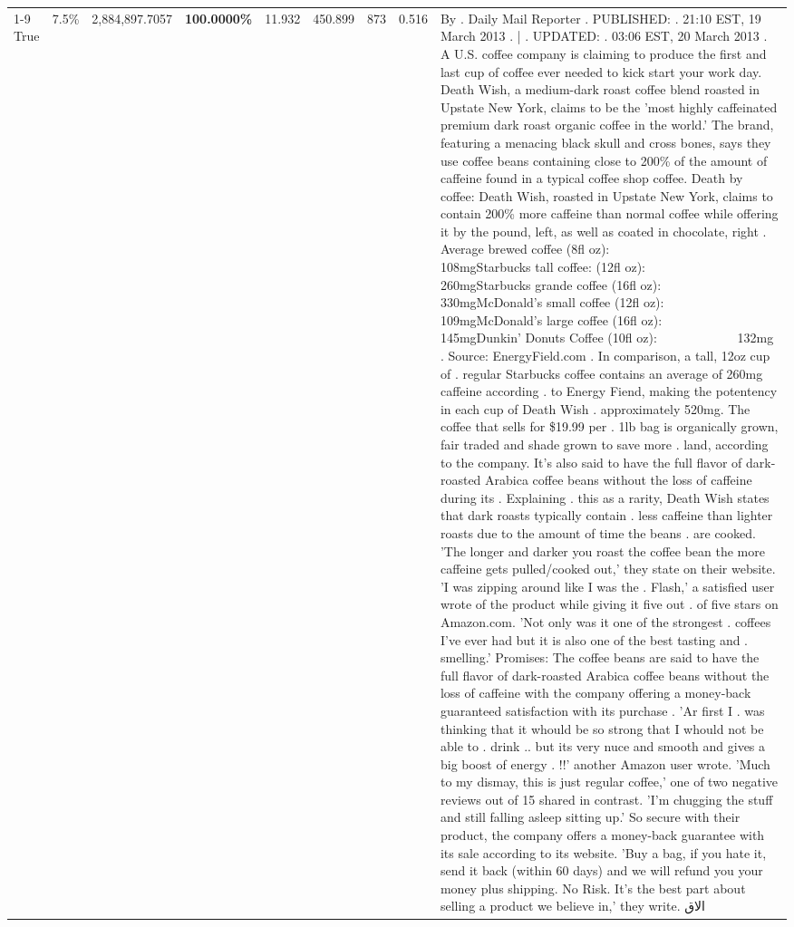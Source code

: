 \begin{table}[H]
{\begin{tabular}{lllrlllll}
\cline{1-9}
True & 7.5\% & 2,884,897.7057 & \bfseries \color{red} 100.0000\% & 11.932 & 450.899 & 873 & 0.516 & By . Daily Mail Reporter . PUBLISHED: . 21:10 EST, 19 March 2013 . | . UPDATED: . 03:06 EST, 20 March 2013 . A U.S. coffee company is claiming to produce the first and last cup of coffee ever needed to kick start your work day. Death Wish, a medium-dark roast coffee blend roasted in Upstate New York, claims to be the 'most highly caffeinated premium dark roast organic coffee in the world.' The brand, featuring a menacing black skull and cross bones, says they use coffee beans containing close to 200\% of the amount of caffeine found in a typical coffee shop coffee. Death by coffee: Death Wish, roasted in Upstate New York, claims to contain 200\% more caffeine than normal coffee while offering it by the pound, left, as well as coated in chocolate, right . Average brewed coffee (8fl oz):              108mgStarbucks tall coffee: (12fl oz):                260mgStarbucks grande coffee (16fl oz):         330mgMcDonald's small coffee (12fl oz):           109mgMcDonald's large coffee (16fl oz):           145mgDunkin' Donuts Coffee (10fl oz):             132mg . Source: EnergyField.com . In comparison, a tall, 12oz cup of . regular Starbucks coffee contains an average of 260mg caffeine according . to Energy Fiend, making the potentency in each cup of Death Wish . approximately 520mg. The coffee that sells for \$19.99 per . 1lb bag is organically grown, fair traded and shade grown to save more . land, according to the company. It's also said to have the full flavor of dark-roasted Arabica coffee beans without the loss of caffeine during its . Explaining . this as a rarity, Death Wish states that dark roasts typically contain . less caffeine than lighter roasts due to the amount of time the beans . are cooked. 'The longer and darker you roast the coffee bean the more caffeine gets pulled/cooked out,' they state on their website. 'I was zipping around like I was the . Flash,' a satisfied user wrote of the product while giving it five out . of five stars on Amazon.com. 'Not only was it one of the strongest . coffees I've ever had but it is also one of the best tasting and . smelling.’ Promises: The coffee beans are said to have the full flavor of dark-roasted Arabica coffee beans without the loss of caffeine with the company offering a money-back guaranteed satisfaction with its purchase . 'Ar first I . was thinking that it whould be so strong that I whould not be able to . drink .. but its very nuce and smooth and gives a big boost of energy . !!' another Amazon user wrote. 'Much to my dismay, this is just regular coffee,' one of two negative reviews out of 15 shared in contrast. 'I'm chugging the stuff and still falling asleep sitting up.' So secure with their product, the company offers a money-back guarantee with its sale according to its website. 'Buy a bag, if you hate it, send it back (within 60 days) and we will refund you your money plus shipping. No Risk. It’s the best part about selling a product we believe in,' they write. الاق \\

\end{tabular}}
\end{table}
